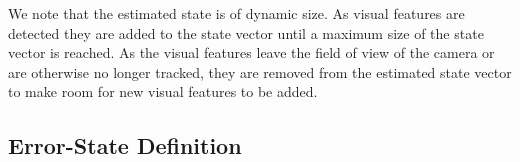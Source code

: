 We note
that the estimated state is of dynamic size. As visual features are
detected they are added to the state vector until a maximum size of the state
vector is reached. As the visual features leave the field of view of the camera
or are otherwise no longer tracked, they are removed from the estimated state
vector to make room for new visual features to be added.



\subsection{Error-State Definition}

